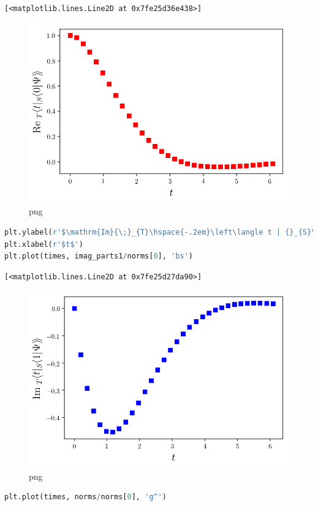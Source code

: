 \begin{lstlisting}
[<matplotlib.lines.Line2D at 0x7fe25d36e438>]
\end{lstlisting}

\begin{figure}
\centering
\includegraphics[width=0.6\linewidth]{output_87_1.png}
\caption{png}
\end{figure}

\begin{lstlisting}[language=Python]
plt.ylabel(r'$\mathrm{Im}{\;}_{T}\hspace{-.2em}\left\langle t | {}_{S}\hspace{-.2em}\left\langle 1 | \Psi \right\rangle\hspace{-.17em}\right\rangle $')
plt.xlabel(r'$t$')
plt.plot(times, imag_parts1/norms[0], 'bs')
\end{lstlisting}

\begin{lstlisting}
[<matplotlib.lines.Line2D at 0x7fe25d27da90>]
\end{lstlisting}

\begin{figure}
\centering
\includegraphics[width=0.6\linewidth]{output_88_1.png}
\caption{png}
\end{figure}

\begin{lstlisting}[language=Python]
plt.plot(times, norms/norms[0], 'g^')
\end{lstlisting}

